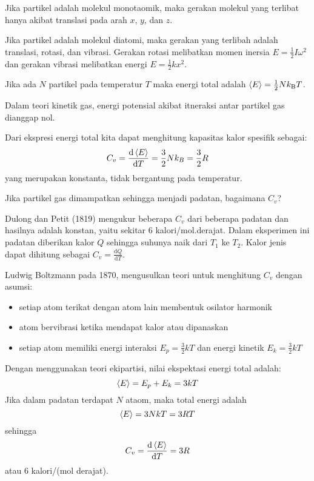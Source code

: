 Jika partikel adalah molekul monotaomik, maka gerakan molekul yang terlibat hanya
akibat translasi pada arah $x$, $y$, dan $z$.

Jika partikel adalah molekul diatomi, maka gerakan yang terlibah adalah translasi, rotasi,
dan vibrasi. Gerakan rotasi melibatkan momen inersia $E = \frac{1}{2} I \omega^2$
dan gerakan vibrasi melibatkan energi $E = \frac{1}{2}kx^2$.

Jika ada $N$ partikel pada temperatur $T$ maka energi total adalah
$\braket{E} = \frac{1}{2}Nk_{\mathrm{B}}T$.

Dalam teori kinetik gas, energi potensial akibat itneraksi antar partikel gas dianggap nol.

Dari ekspresi energi total kita dapat menghitung kapasitas kalor spesifik sebagai:
\begin{equation*}
C_{v} = \frac{\mathrm{d}\braket{E}}{\mathrm{d}T} = \frac{3}{2}Nk_{B} = \frac{3}{2}R
\end{equation*}
yang merupakan konstanta, tidak bergantung pada temperatur.

Jika partikel gas dimampatkan sehingga menjadi padatan, bagaimana $C_{v}$?

Dulong dan Petit (1819) mengukur beberapa $C_{v}$ dari beberapa padatan dan hasilnya adalah
konstan, yaitu sekitar 6 kalori/mol.derajat.
Dalam eksperimen ini padatan diberikan kalor $Q$ sehingga suhunya naik dari $T_{1}$ ke $T_{2}$.
Kalor jenis dapat dihitung sebagai $C_{v} = \frac{\mathrm{d}Q}{\mathrm{d}T}$.

Ludwig Boltzmann pada 1870, mengusulkan teori untuk menghitung $C_{v}$ dengan asumsi:
\begin{itemize}
\item setiap atom terikat dengan atom lain membentuk osilator harmonik
\item atom bervibrasi ketika mendapat kalor atau dipanaskan
\item setiap atom memiliki energi interaksi $E_{p} = \frac{3}{2}kT$ dan
energi kinetik $E_{k} = \frac{3}{2}kT$
\end{itemize}
Dengan menggunakan teori ekipartisi, nilai ekspektasi energi total adalah:
\begin{equation*}
\braket{E} = E_{p} + E_{k} = 3kT
\end{equation*}
Jika dalam padatan terdapat $N$ ataom, maka total energi adalah
\begin{equation*}
\braket{E} = 3NkT = 3RT
\end{equation*}
sehingga
\begin{equation*}
C_{v} = \frac{\mathrm{d}\braket{E}}{\mathrm{d}T} = 3R
\end{equation*}
atau 6 kalori/(mol derajat).

